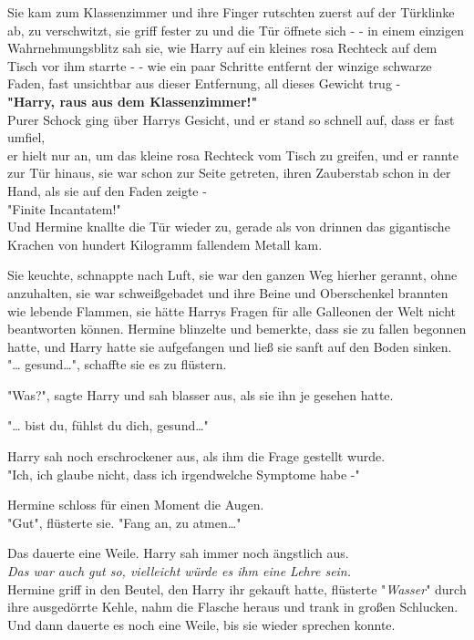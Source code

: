 {Sie kam zum Klassenzimmer und ihre Finger rutschten zuerst auf der Türklinke ab, zu verschwitzt, sie griff fester zu und die Tür öffnete sich - - in einem einzigen Wahrnehmungsblitz sah sie, wie Harry auf ein kleines rosa Rechteck auf dem Tisch vor ihm starrte - - wie ein paar Schritte entfernt der winzige schwarze Faden, fast unsichtbar aus dieser Entfernung, all dieses Gewicht trug -\\ \textbf{"Harry, raus aus dem Klassenzimmer!"}\\ Purer Schock ging über Harrys Gesicht, und er stand so schnell auf, dass er fast umfiel,\\ er hielt nur an, um das kleine rosa Rechteck vom Tisch zu greifen, und er rannte zur Tür hinaus, sie war schon zur Seite getreten, ihren Zauberstab schon in der Hand, als sie auf den Faden zeigte -\\ "Finite Incantatem!"\\ Und Hermine knallte die Tür wieder zu, gerade als von drinnen das gigantische Krachen von hundert Kilogramm fallendem Metall kam.

Sie keuchte, schnappte nach Luft, sie war den ganzen Weg hierher gerannt, ohne anzuhalten, sie war schweißgebadet und ihre Beine und Oberschenkel brannten wie lebende Flammen, sie hätte Harrys Fragen für alle Galleonen der Welt nicht beantworten können. Hermine blinzelte und bemerkte, dass sie zu fallen begonnen hatte, und Harry hatte sie aufgefangen und ließ sie sanft auf den Boden sinken.\\ "… gesund…", schaffte sie es zu flüstern.

"Was?", sagte Harry und sah blasser aus, als sie ihn je gesehen hatte.

"… bist du, fühlst du dich, gesund…"

Harry sah noch erschrockener aus, als ihm die Frage gestellt wurde.\\ "Ich, ich glaube nicht, dass ich irgendwelche Symptome habe -"

Hermine schloss für einen Moment die Augen.\\ "Gut", flüsterte sie. "Fang an, zu atmen…"

Das dauerte eine Weile. Harry sah immer noch ängstlich aus.\\ \emph{Das war auch gut so, vielleicht würde es ihm eine Lehre sein.}\\ Hermine griff in den Beutel, den Harry ihr gekauft hatte, flüsterte "\emph{Wasser}" durch ihre ausgedörrte Kehle, nahm die Flasche heraus und trank in großen Schlucken. Und dann dauerte es noch eine Weile, bis sie wieder sprechen konnte.

}
